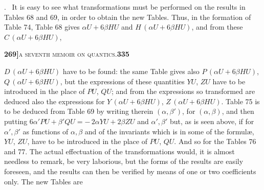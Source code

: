 \documentclass[11pt]{article}
\begin{document}
\medskip

. \ It is easy to see what transformations must be performed on the results in Tables 68 and 69, in order to obtain the new Tables. Thus, in the formation of Table 74, Table 68 gives $\alpha U + 6\beta H U$ and $H\,(\alpha U + 6\beta H U)$, and from these $C\,(\alpha U + 6\beta H U)$,

\newpage
\setcounter{page}{335}

\noindent\textbf{269]}\hfill\textsc{a seventh memoir on quantics.}\hfill\textbf{335}

\medskip

\noindent $D\,(\alpha U + 6\beta H U)$ have to be found: the same Table gives also $P\,(\alpha U + 6\beta H U)$, $Q\,(\alpha U + 6\beta H U)$, but the expressions of these quantities $Y U$, $Z U$ have to be introduced in the place of $P U$, $Q U$; and from the expressions so transformed are deduced also the expressions for $Y\,(\alpha U + 6\beta H U)$, $Z\,(\alpha U + 6\beta H U)$. Table 75 is to be deduced from Table 69 by writing therein $(\alpha, \beta')$, for $(\alpha, \beta)$, and then putting $6\alpha' P U + \beta' Q U = -\,2\alpha Y U + 2\beta Z U$ and $\alpha', \beta'$ but, as is seen above, if for $\alpha', \beta'$ as functions of $\alpha, \beta$ and of the invariants which is in some of the formul\ae, $Y U$, $Z U$, have to be introduced in the place of $P U$, $Q U$. And so for the Tables 76 and 77. The actual effectuation of the transformations would, it is almost needless to remark, be very laborious, but the forms of the results are easily foreseen, and the results can then be verified by means of one or two coefficients only. The new Tables are
\end{document}
